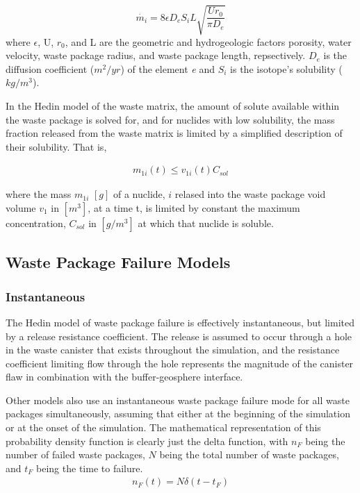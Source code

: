 \begin{equation} \dot{m_i}=8\epsilon D_eS_iL\sqrt{\frac{Ur_0}{\pi D_e}}
\end{equation} where $\epsilon$, U, $r_0$, and L are the geometric and
hydrogeologic factors porosity, water velocity, waste package radius, and waste
package length, repsectively. $D_e$ is the diffusion coefficient ($m^2/yr$) of
the element \emph{e} and $S_i$ is the isotope's solubility ($kg/m^3$).

In the Hedin model of the waste matrix, the amount of solute available within
the waste package is solved for, and for nuclides with low solubility, the mass
fraction released from the waste matrix is limited by a simplified description
of their solubility. That is, 

\begin{align*} m_{1i}(t)\le v_{1i}(t)C_{sol} \end{align*}

where the mass $m_{1i}$ $[g]$ of a nuclide, $i$ relased into the waste package
void volume $v_1$ in $[m^3]$, at a time t, is limited by constant the maximum
concentration, $C_{sol}$ in $[g/m^3]$ at which that nuclide is soluble.
\cite{hedin_integrated_2002}


\subsection{Waste Package Failure Models}




\subsubsection{Instantaneous}
 
The Hedin model of waste package failure is effectively instantaneous, but
limited by a release resistance coefficient. The release is assumed  to occur
through a hole in the waste canister that exists throughout the simulation, and
the resistance coefficient limiting flow through the hole represents the
magnitude of the canister flaw in combination with the buffer-geosphere
interface.  \cite{hedin_integrated_2002}

Other models also use an instantaneous waste package failure mode for all waste  
packages simultaneously, assuming that either at the beginning of the simulation
or at the onset of the simulation. The mathematical representation of this 
probability density function is clearly just the delta function, with $n_F$ 
being the number of failed waste packages, $N$ being the total number of waste 
packages, and $t_F$ being the time to failure.
\begin{align}
  n_F(t) = N\delta(t-t_F)
  \label{instantaneous}
\end{align}

